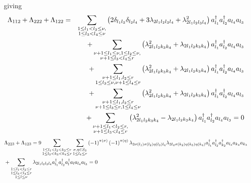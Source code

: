 \documentclass[12pt]{article}
\begin{document}
giving 
\begin{eqnarray}
\Lambda _{112}+\Lambda _{222}+\Lambda _{122} &=&\sum_{\substack{ 1\leq
l_{1}<l_{2}\leq \nu , \\ 1\leq l_{3}<l_{4}\leq \nu }}\left( 2\delta
_{l_{1}l_{3}}\delta _{l_{2}l_{4}}+3\lambda _{2l_{1}l_{2}l_{3}l_{4}}+\lambda
_{2l_{1}l_{2}l_{3}l_{4}}^{2}\right) a_{l_{1}}^{\dagger }a_{l_{2}}^{\dagger
}a_{l_{4}}a_{l_{3}}  \notag \\
&&+\sum_{\substack{ \nu +1\leq l_{1}\leq \nu ,1\leq l_{2}\leq \nu , \\ \nu
+1\leq l_{3}<l_{4}\leq r}}\left( \lambda
_{2l_{1}l_{2}k_{3}k_{4}}^{2}+\lambda _{2l_{1}l_{2}k_{3}k_{4}}\right)
a_{l_{1}}^{\dagger }a_{l_{2}}^{\dagger }a_{l_{4}}a_{l_{3}}  \notag \\
&&+\sum_{\substack{ \nu +1\leq l_{1},l_{2}\leq r \\ 1\leq l_{3}\leq \nu ,\nu
+1\leq l_{4}\leq r}}\left( \lambda _{2l_{1}l_{2}k_{3}k_{4}}^{2}+\lambda
_{2l_{1}l_{2}k_{3}k_{4}}\right) a_{l_{1}}^{\dagger }a_{l_{2}}^{\dagger
}a_{l_{4}}a_{l_{3}}  \notag \\
&&+\sum_{\substack{ \nu +1\leq l_{1},l_{2}\leq r \\ \nu +1\leq l_{3}\leq
r,1\leq l_{4}\leq \nu }}\left( \lambda _{2l_{1}l_{2}k_{3}k_{4}}^{2}+\lambda
_{2l_{1}l_{2}k_{3}k_{4}}\right) a_{l_{1}}^{\dagger }a_{l_{2}}^{\dagger
}a_{l_{4}}a_{l_{3}}  \notag \\
&&+\sum_{\substack{ \nu +1\leq l_{1}<l_{2}\leq r, \\ \nu +1\leq
l_{3}<l_{4}\leq r}}\left( \lambda _{2l_{1}l_{2}k_{3}k_{4}}^{2}-\lambda
_{2l_{1}l_{2}k_{3}k_{4}}\right) a_{l_{1}}^{\dagger }a_{l_{2}}^{\dagger
}a_{l_{4}}a_{l_{3}}\left. =\right. 0
\end{eqnarray}%
\begin{align}
& \Lambda _{223}+\Lambda _{123}=9\sum_{\substack{ 1\leq
l_{1}<l_{2}<k_{2}\leq r \\ 1\leq l_{3}<k_{3}<k_{4}\leq r}}\sum_{\substack{ %
\sigma ,\eta \in S_{3} \\ 1\leq l_{4}\leq r}}\left( -1\right) ^{\pi \left(
\sigma \right) }\left( -1\right) ^{\pi \left( \eta \right) }\lambda
_{2\sigma \left( l_{1}\right) \sigma \left( l_{2}\right) \eta \left(
l_{3}\right) l_{4}}\lambda _{2l_{4}\sigma \left( k_{2}\right) \eta \left(
k_{3}\right) \eta \left( k_{4}\right) }a_{l_{1}}^{\dagger
}a_{l_{2}}^{\dagger }a_{k_{2}}^{\dagger }a_{l_{3}}a_{k_{4}}a_{k_{3}}  \notag
\\
& +\sum_{\substack{ 1\leq l_{1}<l_{2}\leq r \\ 1\leq l_{3}<l_{4}\leq r \\ %
1\leq l\leq \nu }}\lambda _{2l_{1}l_{2}l_{3}l_{4}}a_{l_{1}}^{\dagger
}a_{l_{2}}^{\dagger }a_{l}^{\dagger }a_{l}a_{l_{4}}a_{l_{3}}\left. =\right. 0
\notag
\end{align}%
\end{document}
